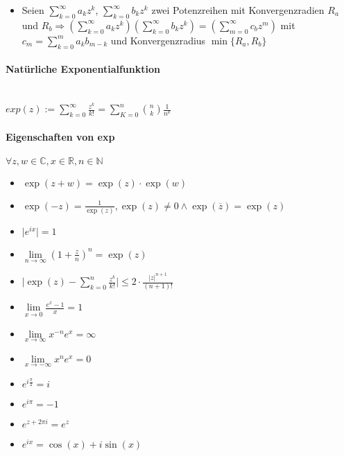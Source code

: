 \documentclass[paper=a3,paper=landscape, fontsize=9pt, DIV=30]{scrartcl}
\newcommand{\real}{{\mathbb{R}}}
\newcommand{\compl}{\mathbb{C}}
\newcommand{\nat}{\mathbb{N}}
\begin{document}
\begin{multicols*}{4}
\begin{itemize}
  \item Seien $ \sum_{k=0}^{\infty} a_kz^k$, $\sum_{k=0}^{\infty} b_kz^k$ zwei Potenzreihen mit Konvergenzradien $R_a$ und $ R_b \Rightarrow (\sum_{k=0}^{\infty} a_kz^k)(\sum_{k=0}^{\infty} b_kz^k)=(\sum_{m=0}^{\infty} c_bz^m)$ mit $ c_m = \sum_{k=0}^{m} a_kb_{m-k}$ und Konvergenzradius $\min\{R_a,R_b\}$
  \end{itemize}


  \paragraph{Natürliche Exponentialfunktion}\hspace{0pt} \\
  $ exp(z) := \sum_{k=0}^{\infty} \frac{z^k}{k!} = \sum_{K=0}^{n}\binom{n}{k}\frac{1}{n^k}$


  \paragraph{Eigenschaften von exp}
  $\forall z,w \in \compl, x \in \real, n \in \nat$
  \begin{itemize}
  \item $\exp(z+w)=\exp(z)\cdot \exp(w)$
  \item $\exp(-z)=\frac{1}{\exp(z)}, \exp(z) \neq 0 \wedge \exp(\overline{z})=\exp(z)$
  \item $\lvert e^{ix} \rvert = 1$
  \item $\lim\limits_{n \rightarrow \infty} (1+\frac{z}{n})^n=\exp(z)$
  \item $ \lvert \exp(z)- \sum_{k=0}^{n} \frac{z^k}{k!} \rvert \leq 2 \cdot \frac{\lvert z \rvert ^{n+1}}{(n+1)!}$
  \item $ \lim\limits_{x \rightarrow 0} \frac{e^x-1}{x} = 1$
  \item $ \lim\limits_{x \rightarrow \infty} x^{-n}e^x=\infty$
  \item $ \lim\limits_{x \rightarrow -\infty} x^ne^x=0$
  \item $e^{i \frac{\pi}{2}} = i$
  \item $e^{i\pi}=-1$
  \item $e^{z+2\pi i}=e^z$
  \item $e^{ix}=\cos(x)+i\sin(x)$
  \end{itemize}



\end{multicols*}
\end{document}
